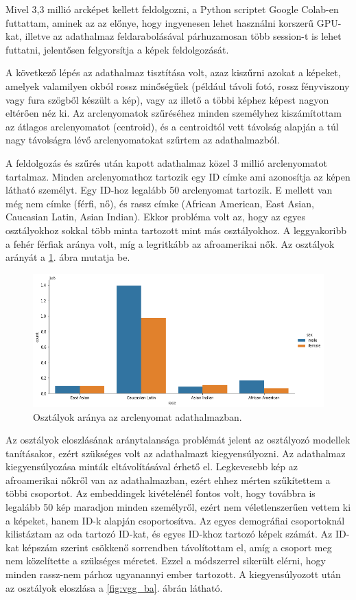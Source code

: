 Mivel 3,3 millió arcképet kellett feldolgozni, a Python scriptet Google Colab-en futtattam, aminek az az előnye, hogy ingyenesen lehet használni korszerű GPU-kat, illetve az adathalmaz feldarabolásával párhuzamosan több session-t is lehet futtatni, jelentősen felgyorsítja a képek feldolgozását.

A következő lépés az adathalmaz tisztítása volt, azaz kiszűrni azokat a képeket, amelyek valamilyen okból rossz minőségűek (például távoli fotó, rossz fényviszony vagy fura szögből készült a kép), vagy az illető a többi képhez képest nagyon eltérően néz ki. Az arclenyomatok szűréséhez minden személyhez kiszámítottam az átlagos arclenyomatot (centroid), és a centroidtól vett távolság alapján a túl nagy távolságra lévő arclenyomatokat szűrtem az adathalmazból. 

A feldolgozás és szűrés után kapott adathalmaz közel 3 millió arclenyomatot tartalmaz. Minden arclenyomathoz tartozik egy ID címke ami azonosítja az képen látható személyt. Egy ID-hoz legalább 50 arclenyomat tartozik. E mellett van még nem címke (férfi, nő), és rassz címke (African American, East Asian, Caucasian Latin, Asian Indian). Ekkor probléma volt az, hogy az egyes osztályokhoz sokkal több minta tartozott mint más osztályokhoz. A leggyakoribb a fehér férfiak aránya volt, míg a legritkább az afroamerikai nők. Az osztályok arányát a \ref{fig:vgg_imba}. ábra mutatja be.

\begin{figure}[ht]
	\centering
	\includegraphics[width=1\columnwidth]{figures/VGG_imba.png}
	\caption{Osztályok aránya az arclenyomat adathalmazban.}
	\label{fig:vgg_imba}
\end{figure}

Az osztályok eloszlásának aránytalansága problémát jelent az osztályozó modellek tanításakor, ezért szükséges volt az adathalmazt kiegyensúlyozni. Az adathalmaz kiegyensúlyozása minták eltávolításával érhető el. Legkevesebb kép az afroamerikai nőkről van az adathalmazban, ezért ehhez mérten szűkítettem a többi csoportot. Az embeddingek kivételénél fontos volt, hogy továbbra is legalább 50 kép maradjon minden személyről, ezért nem véletlenszerűen vettem ki a képeket, hanem ID-k alapján csoportosítva. Az egyes demográfiai csoportoknál kilistáztam az oda tartozó ID-kat, és egyes ID-khoz tartozó képek számát. Az ID-kat képszám szerint csökkenő sorrendben távolítottam el, amíg a csoport meg nem közelítette a szükséges méretet. Ezzel a módszerrel sikerült elérni, hogy minden rassz-nem párhoz ugyanannyi ember tartozott. A kiegyensúlyozott után az osztályok eloszlása a \ref{fig:vgg_ba}. ábrán látható.

